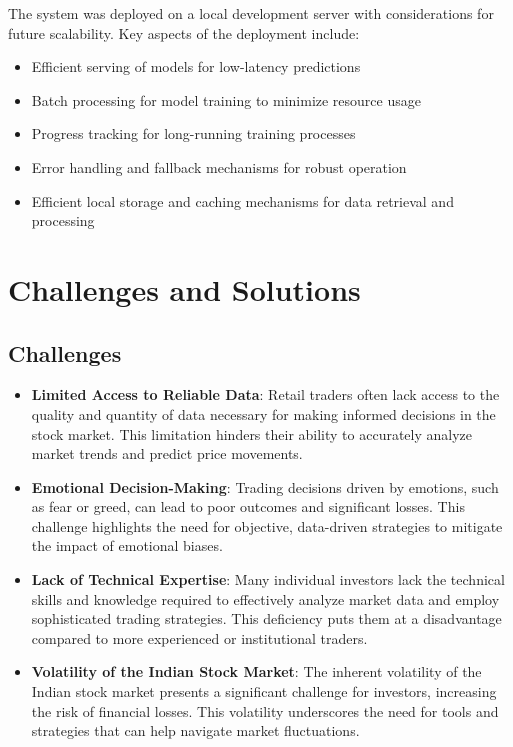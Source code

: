 \documentclass[conference]{IEEEtran}
\begin{document}
The system was deployed on a local development server with considerations for future scalability. Key aspects of the deployment include:

\begin{itemize}
\item Efficient serving of models for low-latency predictions
\item Batch processing for model training to minimize resource usage
\item Progress tracking for long-running training processes
\item Error handling and fallback mechanisms for robust operation
\item Efficient local storage and caching mechanisms for data retrieval and processing
\end{itemize}

\section{Challenges and Solutions}

\subsection{Challenges}

\begin{itemize}
\item \textbf{Limited Access to Reliable Data}: Retail traders often lack access to the quality and quantity of data necessary for making informed decisions in the stock market. This limitation hinders their ability to accurately analyze market trends and predict price movements.
\item \textbf{Emotional Decision-Making}: Trading decisions driven by emotions, such as fear or greed, can lead to poor outcomes and significant losses. This challenge highlights the need for objective, data-driven strategies to mitigate the impact of emotional biases.
\item \textbf{Lack of Technical Expertise}: Many individual investors lack the technical skills and knowledge required to effectively analyze market data and employ sophisticated trading strategies. This deficiency puts them at a disadvantage compared to more experienced or institutional traders.
\item \textbf{Volatility of the Indian Stock Market}: The inherent volatility of the Indian stock market presents a significant challenge for investors, increasing the risk of financial losses. This volatility underscores the need for tools and strategies that can help navigate market fluctuations.
\end{itemize}
\end{document}
